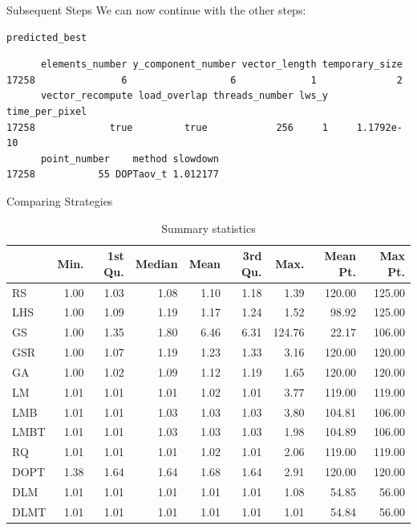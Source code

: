 \documentclass[10pt, compress, aspectratio=169, xcolor={table,usenames,dvipsnames}]{beamer}
\begin{document}
\begin{frame}[fragile,label={sec:org51a8fa7}]{Subsequent Steps}
 We can now \alert{continue} with the \alert{other steps}:
\scriptsize
\lstset{language=r,label= ,caption= ,captionpos=b,numbers=none}
\begin{lstlisting}
predicted_best
\end{lstlisting}

\begin{verbatim}
      elements_number y_component_number vector_length temporary_size
17258               6                  6             1              2
      vector_recompute load_overlap threads_number lws_y time_per_pixel
17258             true         true            256     1     1.1792e-10
      point_number    method slowdown
17258           55 DOPTaov_t 1.012177
\end{verbatim}

\normalsize
\end{frame}

\begin{frame}[label={sec:org1d61f12}]{Comparing Strategies}
\vspace{0.3cm}

\begin{table}[ht]
\centering
\begingroup\small
\begin{tabular}{lrrrrrrrr}
  \hline
 & Min. & 1st Qu. & Median & Mean & 3rd Qu. & Max. & Mean Pt. & Max Pt. \\
  \hline
RS & 1.00 & 1.03 & 1.08 & 1.10 & 1.18 & 1.39 & 120.00 & 125.00 \\
  LHS & 1.00 & 1.09 & 1.19 & 1.17 & 1.24 & 1.52 & 98.92 & 125.00 \\
  GS & 1.00 & 1.35 & 1.80 & 6.46 & 6.31 & 124.76 & 22.17 & 106.00 \\
  GSR & 1.00 & 1.07 & 1.19 & 1.23 & 1.33 & 3.16 & 120.00 & 120.00 \\
  GA & 1.00 & 1.02 & 1.09 & 1.12 & 1.19 & 1.65 & 120.00 & 120.00 \\
  LM & 1.01 & 1.01 & 1.01 & 1.02 & 1.01 & 3.77 & 119.00 & 119.00 \\
  LMB & 1.01 & 1.01 & 1.03 & 1.03 & 1.03 & 3.80 & 104.81 & 106.00 \\
  LMBT & 1.01 & 1.01 & 1.03 & 1.03 & 1.03 & 1.98 & 104.89 & 106.00 \\
  RQ & 1.01 & 1.01 & 1.01 & 1.02 & 1.01 & 2.06 & 119.00 & 119.00 \\
  DOPT & 1.38 & 1.64 & 1.64 & 1.68 & 1.64 & 2.91 & 120.00 & 120.00 \\
  DLM & 1.01 & 1.01 & 1.01 & 1.01 & 1.01 & 1.08 & 54.85 & 56.00 \\
  DLMT & 1.01 & 1.01 & 1.01 & 1.01 & 1.01 & 1.01 & 54.84 & 56.00 \\
   \hline
\end{tabular}
\endgroup
\caption{Summary statistics}
\end{table}
\end{frame}
\end{document}
